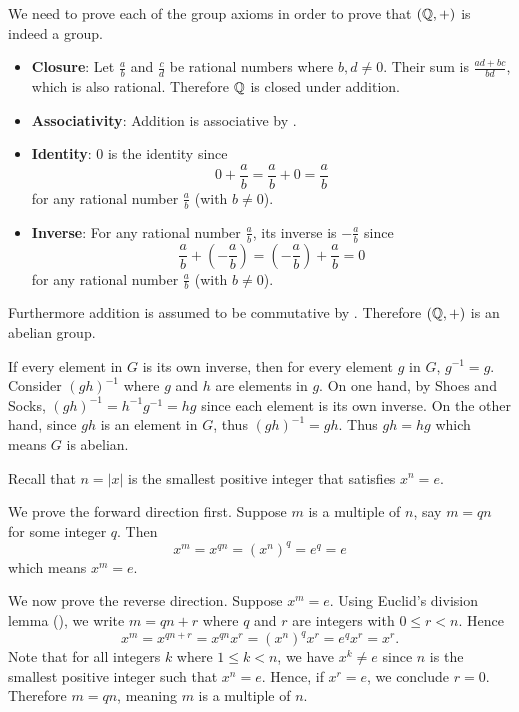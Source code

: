 \begin{questions}
    \item We need to prove each of the group axioms in order to prove that $(\mathbb{Q}, +)$ is indeed a group.
    \begin{itemize}
        \item \textbf{Closure}: Let $\frac ab$ and $\frac cd$ be rational numbers where $b, d \neq 0$. Their sum is $\frac{ad+bc}{bd}$, which is also rational. Therefore $\mathbb{Q}$ is closed under addition.

        \item \textbf{Associativity}: Addition is associative by .

        \item \textbf{Identity}: 0 is the identity since
        \[
            0 + \frac ab = \frac ab + 0 = \frac ab
        \]
        for any rational number $\frac ab$ (with $b \neq 0$).

        \item \textbf{Inverse}: For any rational number $\frac ab$, its inverse is $-\frac ab$ since
        \[
            \frac ab + \left(-\frac ab\right) = \left(-\frac ab\right) + \frac ab = 0
        \]
        for any rational number $\frac ab$ (with $b \neq 0$).
    \end{itemize}
    Furthermore addition is assumed to be commutative by . Therefore $(\mathbb{Q}, +)$ is an abelian group.

    \item If every element in $G$ is its own inverse, then for every element $g$ in $G$, $g^{-1} = g$. Consider $(gh)^{-1}$ where $g$ and $h$ are elements in $g$. On one hand, by Shoes and Socks, $(gh)^{-1} = h^{-1}g^{-1} = hg$ since each element is its own inverse. On the other hand, since $gh$ is an element in $G$, thus $(gh)^{-1} = gh$. Thus $gh = hg$ which means $G$ is abelian.

    \item Recall that $n = |x|$ is the smallest positive integer that satisfies $x^n = e$.

    We prove the forward direction first. Suppose $m$ is a multiple of $n$, say $m = qn$ for some integer $q$. Then
    \[
        x^m = x^{qn} = \left(x^n\right)^q = e^q = e
    \]
    which means $x^m = e$.

    We now prove the reverse direction. Suppose $x^m = e$. Using Euclid's division lemma (), we write $m = qn + r$ where $q$ and $r$ are integers with $0 \leq r < n$. Hence
    \[
        x^m = x^{qn + r} = x^{qn}x^r = \left(x^n\right)^qx^r = e^qx^r = x^r.
    \]
    Note that for all integers $k$ where $1 \leq k < n$, we have $x^k \neq e$ since $n$ is the smallest positive integer such that $x^n = e$. Hence, if $x^r = e$, we conclude $r = 0$. Therefore $m = qn$, meaning $m$ is a multiple of $n$.


\end{questions}
